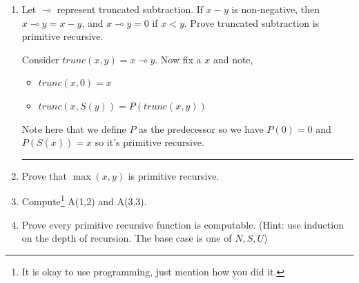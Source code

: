 \documentclass[11pt]{article}
\newenvironment{proof}{{\bf Proof:}}{\hfill\rule{2mm}{2mm}}
\begin{document}
\begin{enumerate}
    \begin{itemize}
        \item $exp(0,x) = 1 = S(0)$
        \item $exp(S(y), x) = mul(x, exp(y, x))$
    \end{itemize}


    \item Let $\multimap$ represent truncated subtraction. If $x -y$ is non-negative, then $x \multimap y = x-y$, and $x \multimap y = 0$ if $x < y$. Prove truncated subtraction is primitive recursive.

      \begin{proof}
        Consider $trunc(x, y) = x \multimap y$. Now fix a $x$ and note, 
        \begin{itemize}
          \item $trunc(x, 0) =  x$
          \item $trunc(x, S(y)) = P(trunc(x, y))$ 
        \end{itemize}
      Note here that we define $P$ as the predecessor so we have $P(0) = 0$ and $P(S(x)) = x$ so it's primitive recursive.
      \end{proof}

    
    \item Prove that $\max(x,y)$ is primitive recursive.
    \item Compute\footnote{It is okay to use programming, just mention how you did it.} A(1,2) and A(3,3).
    
    \item Prove every primitive recursive function is computable. (Hint: use induction on the depth of recursion. The base case is one of $N,S,U$)


\end{enumerate}
\end{document}
